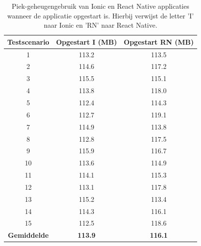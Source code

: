 \begin{table}[htbp]
  \centering
  \begin{tabular}{|c|c|c|}
      \hline
      \textbf{Testscenario} & \textbf{Opgestart I (MB)} & \textbf{Opgestart RN (MB)} \\
      \hline
      1 & 113.2 & 113.5 \\
      \hline
      2 & 114.6 & 117.2 \\
      \hline
      3 & 115.5 & 115.1 \\
      \hline
      4 & 113.8 & 118.0 \\
      \hline
      5 & 112.4 & 114.3 \\
      \hline
      6 & 112.7 & 119.1 \\
      \hline
      7 & 114.9 & 113.8 \\
      \hline
      8 & 112.8 & 117.5 \\
      \hline
      9 & 115.9 & 116.7 \\
      \hline
      10 & 113.6 & 114.9 \\
      \hline
      11 & 114.1 & 115.3 \\
      \hline
      12 & 113.1 & 117.8 \\
      \hline
      13 & 115.2 & 113.4 \\
      \hline
      14 & 114.3 & 116.1 \\
      \hline
      15 & 112.5 & 118.6 \\
      \hline
      \textbf{Gemiddelde} & \textbf{113.9} & \textbf{116.1} \\
      \hline
  \end{tabular}
  \caption{Piek-geheugengebruik van Ionic en React Native applicaties wanneer de applicatie opgestart is. Hierbij verwijst de letter 'I' naar Ionic en 'RN' naar React Native.}
  \label{tab:memory1}
\end{table}

